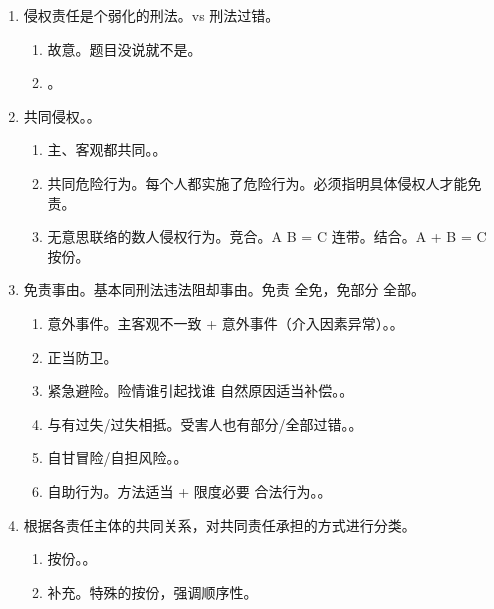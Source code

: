 \begin{enumerate}
\begin{enumerate}
\begin{enumerate}
                \end{enumerate}
        \end{enumerate}
  \item 侵权责任是个弱化的刑法。vs 刑法过错。
        \begin{enumerate}
          \item 故意。题目没说就不是。
          \item {}。
        \end{enumerate}
  \item 共同侵权。。
        \begin{enumerate}
          \item 主、客观都共同。。
          \item 共同危险行为。每个人都实施了危险行为。必须指明具体侵权人才能免责。
          \item 无意思联络的数人侵权行为。\yi 竞合。A \hz B = C \yjt 连带。\er 结合。A + B = C \yjt 按份。
        \end{enumerate}
  \item 免责事由。基本同刑法违法阻却事由。免责 \bdy 全免，免部分 \hz 全部。
        \begin{enumerate}
          \item 意外事件。主客观不一致 + 意外事件（介入因素异常）。。
          \item 正当防卫。
          \item 紧急避险。险情谁引起找谁 \yjt 自然原因适当补偿。。
          \item 与有过失/过失相抵。受害人也有部分/全部过错。。
          \item 自甘冒险/自担风险。。
          \item 自助行为。方法适当 + 限度必要 \yjt 合法行为。。
        \end{enumerate}
  \item 根据各责任主体的共同关系，对共同责任承担的方式进行分类。
        \begin{enumerate}
          \item 按份。。
          \item 补充。特殊的按份，强调顺序性。
                \begin{enumerate}

\end{enumerate}
\end{enumerate}
\end{enumerate}
